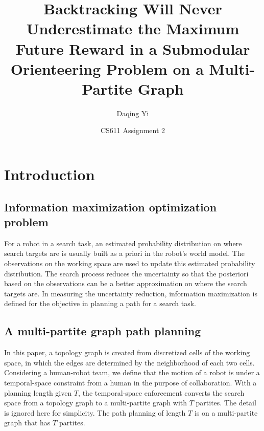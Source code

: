\documentclass[12pt]{article}
\begin{document}
\title{\textsf{Backtracking Will Never Underestimate the Maximum Future Reward in a Submodular Orienteering Problem on a Multi-Partite Graph}}
\author{\textsf{Daqing Yi}}
\date{\textsf{CS611 Assignment 2}}

\maketitle

\section{Introduction}

\subsection{Information maximization optimization problem}

For a robot in a search task, an estimated probability distribution on where search targets are is usually built as a priori in the robot's world model.
The observations on the working space are used to update this estimated probability distribution.
The search process reduces the uncertainty so that the posteriori based on the observations can be a better approximation on where the search targets are. In measuring the uncertainty reduction, information maximization is defined for the objective in planning a path for a search task.

\subsection{A multi-partite graph path planning}

In this paper, a topology graph is created from discretized cells of the working space, in which the edges are determined by the neighborhood of each two cells. 
Considering a human-robot team, we define that the motion of a robot is under a temporal-space constraint from a human in the purpose of collaboration. 
With a planning length given $ T $, the temporal-space enforcement converts the search space from a topology graph to a multi-partite graph with $ T $ partites. The detail is ignored here for simplicity. The path planning of length $ T $ is on a multi-partite graph that has $ T $ partites.
\end{document}
